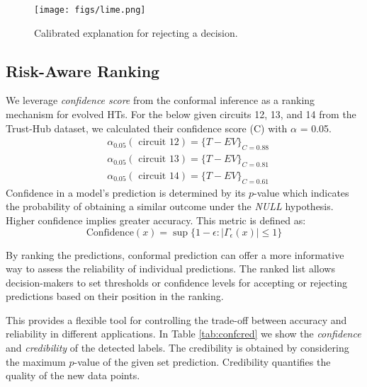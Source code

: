 \documentclass[9pt,conference]{IEEEtran}
\begin{document}
\begin{figure*}[h]
\centering
  \texttt{[image: figs/lime.png]}
  \caption{Calibrated explanation for rejecting a decision.}
  \label{fig:lime}
\end{figure*}

\subsection{Risk-Aware Ranking}
\label{Sec:Risk}
We leverage \textit{confidence score} from the conformal inference as a ranking mechanism for evolved HTs. For the below given circuits 12, 13, and 14 from the Trust-Hub dataset, we calculated their confidence score (C) with $\alpha$ = 0.05. 
$$
\begin{aligned}
& \alpha_{0.05}(\text { circuit } 12)=\{T-E V\}_{C=0.88} \\
& \alpha_{0.05}(\text { circuit } 13)=\{T-E V\}_{C=0.81} \\
& \alpha_{0.05}(\text { circuit } 14)=\{T-E V\}_{C=0.61}
\end{aligned}
$$
Confidence in a model's prediction is determined by its $p$-value which indicates the probability of obtaining a similar outcome under the \textit{NULL} hypothesis. Higher confidence implies greater accuracy. This metric is defined as:
$$\text{Confidence} (x) = \sup \{1 - \epsilon : |\Gamma_\epsilon (x)| \leq 1\} $$

By ranking the predictions, conformal prediction can offer a more informative way to assess the reliability of individual predictions. The ranked list allows decision-makers to set thresholds or confidence levels for accepting or rejecting predictions based on their position in the ranking.

This provides a flexible tool for controlling the trade-off between accuracy and reliability in different applications. In Table \ref{tab:confcred} we show the \textit{confidence} and \textit{credibility} of the detected labels. The credibility is obtained by considering the maximum $p$-value of the given set prediction. Credibility quantifies the quality of the new data points. 
\end{document}
